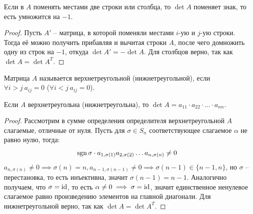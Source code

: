 \documentclass[12pt]{article}
\begin{document}
\begin{statement}
	Если в $A$ поменять местами две строки или столбца, то $\det A$
	поменяет знак, то есть умножится на $-1$.
	\begin{proof}
		Пусть $A'$ -- матрица, в которой поменяли местами $i$-ую и $j$-ую
		строки. Тогда её можно получить прибавляя и вычитая строки $A$,
		после чего домножить одну из строк на $-1$, откуда $\det A'=-\det
		A$. Для столбцов верно, так как $\det A=\det A^T$.
	\end{proof}
\end{statement}
\begin{definition}
	Матрица $A$ называется верхнетреугольной (нижнетреугольной), если
	$\forall i>j\ a_{ij}=0$ ($\forall i<j\ a_{ij}=0$).
\end{definition}
\begin{statement}
	Если $A$ верхнетреугольна (нижнетреугольна), то $\det A=a_{11}\cdot
	a_{22}\cdot\ldots\cdot a_{nn}$.
	\begin{proof}
		Рассмотрим в сумме определения определителя верхнетреугольной $A$
		слагаемые, отличные от нуля. Пусть для $\sigma\in S_n$
		соответствующее слагаемое $\alpha$ не равно нулю, тогда:
		\[\operatorname{sgn} \sigma\cdot a_{1,\sigma(1)}a_{2,\sigma(2)}\ldots
		a_{n,\sigma(n)}\neq0\]		$a_{n,\sigma(n)}\neq0\implies \sigma(n)=n,
		a_{n-1,\sigma(n-1)}\neq0\implies \sigma(n-1)\in\{n-1, n\}$, но
		$\sigma$ -- перестановка, то есть инъективна, значит
		$\sigma(n-1)=n-1$. Аналогично получаем, что $\sigma=\operatorname{id}$, то есть
		$\alpha\neq0\implies \sigma=\operatorname{id}$, значит единственное ненулевое
		слагаемое равно произведению элементов на главной диагонали. Для
		нижнетреугольной верно, так как $\det A=\det A^T$.
	\end{proof}
\end{statement}
\end{document}
